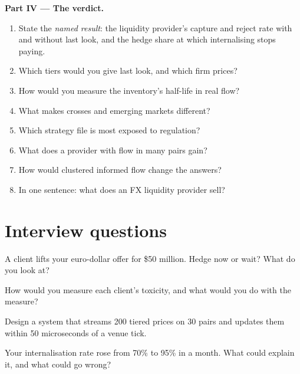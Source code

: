 \begin{problem}
\medskip\noindent\textbf{Part IV --- The verdict.}
\begin{enumerate}[resume]
\item State the \emph{named result}: the liquidity provider's capture and reject rate with and without last look, and the hedge share at which
internalising stops paying.
\item Which tiers would you give last look, and which firm prices?
\item How would you measure the inventory's half-life in real flow?
\item What makes crosses and emerging markets different?
\item Which strategy file is most exposed to regulation?
\item What does a provider with flow in many pairs gain?
\item How would clustered informed flow change the answers?
\item In one sentence: what does an FX liquidity provider sell?
\end{enumerate}
\end{problem}

\section{Interview questions}

\begin{interviewq}\label{iq:hf:fx-market-making:1}
A client lifts your euro-dollar offer for \$50 million. Hedge now or wait? What do you look at?
\end{interviewq}

\begin{interviewq}\label{iq:hf:fx-market-making:2}
How would you measure each client's toxicity, and what would you do with the measure?
\end{interviewq}

\begin{interviewq}\label{iq:hf:fx-market-making:3}
Design a system that streams 200 tiered prices on 30 pairs and updates them within 50 microseconds of a venue tick.
\end{interviewq}

\begin{interviewq}\label{iq:hf:fx-market-making:4}
Your internalisation rate rose from 70\% to 95\% in a month. What could explain it, and what could go wrong?
\end{interviewq}

